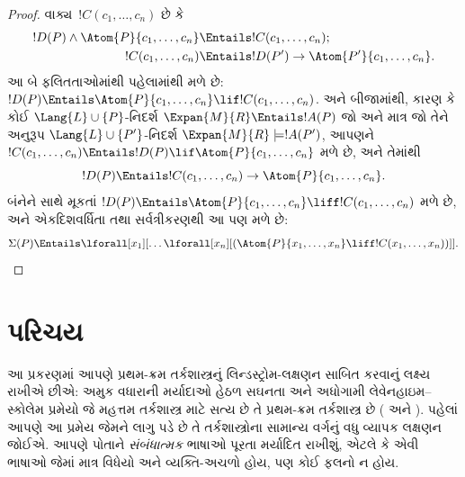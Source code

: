 \begin{proof}
વાક્ય~$!C(c_1,\dots,c_n)$ છે કે
\begin{align*}
  !D(P) \land \Atom{P}{c_1, \dots, c_n} & \Entails !C(c_1,\dots, c_n); \\
  !C(c_1,\dots, c_n) & \Entails !D(P') \to \Atom{P'}{c_1, \dots, c_n}.
\end{align*}
આ બે ફલિતતાઓમાંથી પહેલામાંથી મળે છે: $!D(P)\Entails
\Atom{P}{c_1,\dots,c_n}\lif !C(c_1,\dots,c_n)$. અને બીજામાંથી,
કારણ કે કોઈ $\Lang{L}\cup\{P\}$-નિદર્શ $\Expan{M}{R}\Entails
!A(P)$ જો અને માત્ર જો તેને અનુરૂપ $\Lang{L}\cup\{P'\}$-નિદર્શ
$\Expan{M}{R}\models !A(P')$, આપણને
$!C(c_1,\dots,c_n)\Entails !D(P)\lif\Atom{P}{c_1,\dots,c_n}$ મળે છે,
અને તેમાંથી
\[
!D(P) \Entails !C(c_1,\dots,c_n) \to \Atom{P}{c_1,\dots, c_n}.
\]
બંનેને સાથે મૂકતાં $!D(P)\Entails\Atom{P}{c_1,\dots,c_n}\liff
!C(c_1,\dots,c_n)$ મળે છે, અને એકદિશવર્ધિતા તથા સર્વત્રીકરણથી આ પણ
મળે છે:
\[
\Sigma(P) \Entails
\lforall[x_1][\dots\lforall[x_n][(\Atom{P}{x_1,\dots, x_n} \liff
    !C(x_1,\dots, x_n))]].
\]
\end{proof}
\endgroup


\OLEndChapterHook
\endgroup


\begingroup
\makeatletter{}\makeatother

\label{guunit:OLP-0203}


\begingroup
\makeatletter{}\makeatother

\section{પરિચય}
\label{guunit:OLP-0204}


આ પ્રકરણમાં આપણે પ્રથમ-ક્રમ તર્કશાસ્ત્રનું લિન્ડસ્ટ્રોમ-લક્ષણન સાબિત
કરવાનું લક્ષ્ય રાખીએ છીએ: અમુક વધારાની મર્યાદાઓ હેઠળ સઘનતા અને અધોગામી
લેવેનહાઇમ--સ્કોલેમ પ્રમેયો જે મહત્તમ તર્કશાસ્ત્ર માટે સત્ય છે તે
પ્રથમ-ક્રમ તર્કશાસ્ત્ર છે
( અને
). પહેલાં આપણે આ પ્રમેય જેમને લાગુ
પડે છે તે તર્કશાસ્ત્રોના સામાન્ય વર્ગનું વધુ વ્યાપક લક્ષણન જોઈએ. આપણે
પોતાને \emph{સંબંધાત્મક} ભાષાઓ પૂરતા મર્યાદિત રાખીશું, એટલે કે એવી
ભાષાઓ જેમાં માત્ર વિધેયો અને વ્યક્તિ-અચળો હોય, પણ કોઈ
ફલનો ન હોય.
\endgroup


\begingroup
\makeatletter{}\makeatother


